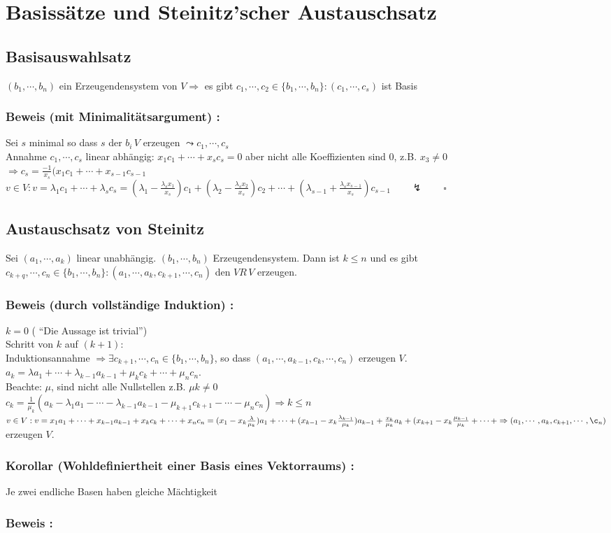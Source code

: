 \section{Basissätze und Steinitz'scher Austauschsatz}
%
%
%
\subsection{Basisauswahlsatz}
$(b_{1},\cdots, b_{n})$ ein Erzeugendensystem von $V \Rightarrow$  es gibt $c_{1},\cdots,c_{2} \in \{b_{1}, \cdots, b_{n}\}:(c_{1},\cdots,c_{s})$ ist Basis
%
\subsubsection{Beweis (mit Minimalitätsargument) :}
Sei $s$ minimal so dass $s$ der $b_{i} \, V$  erzeugen $ \leadsto c_{1},\cdots,c_{s}$\\
Annahme $c_{1},\cdots,c_{s}$ linear abhängig: $x_{1}c_{1}+\cdots+x_{s}c_{s} = 0$ aber nicht alle Koeffizienten sind $0$, z.B. $x_{3} \neq 0$\\
$\Rightarrow c_{s}=\frac{-1}{x_{s}}(x_{1}c_{1}+\cdots+x_{s-1}c_{s-1}$\\
$v\in V: v=\lambda_{1}c_{1}+\cdots+\lambda_{s}c_{s}=(\lambda_{1}-\frac{\lambda_{s}x_{1}}{x_{s}})c_{1}+(\lambda_{2}-\frac{\lambda_{s}x_{2}}{x_{s}})c_{2}+\cdots+(\lambda_{s-1}+\frac{\lambda_{s}x_{s-1}}{x_{s}})c_{s-1} \qquad \lightning \qquad \square$
%
%
%
\subsection{Austauschsatz von Steinitz}
Sei $(a_{1},\cdots,a_{k})$ linear unabhängig. $(b_{1},\cdots,b_{n})$ Erzeugendensystem. Dann ist $k\leq n$ und es gibt $c_{k+q},\cdots,c_{n} \in \{b_{1},\cdots,b_{n}\}:(a_{1},\cdots,a_{k},c_{k+1},\cdots,c_{n})$ den $VR \, V$ erzeugen.
%
\subsubsection{Beweis (durch vollständige Induktion) :}
$k=0$ ( "`Die Aussage ist trivial"')\\
Schritt von $k$ auf $(k+1)$: \\
Induktionsannahme $\Rightarrow \exists c_{k+1},\cdots,c_{n} \in \{b_{1},\cdots,b_{n}\}$, so dass $(a_{1},\cdots,a_{k-1},c_{k},\cdots,c_{n})$ erzeugen $V$. \\
$a_{k}=\lambda a_{1}+\cdots+\lambda_{k-1}a_{k-1}+\mu_{k}c_{k}+\cdots+\mu_{n}c_{n}$. \\
Beachte: $\mu$, sind nicht alle Nullstellen z.B. $\mu k \neq 0$\\
$c_{k}=\frac{1}{\mu_{k}}(a_{k}-\lambda_{1}a_{1}-\cdots-\lambda_{k-1}a_{k-1}-\mu_{k+1}c_{k+1}-\cdots-\mu_{n}c_{n}) \Rightarrow k \leq n$\\
$v\in V: v = x_{1}a_{1}+\cdots+x_{k-1}a_{k-1}+x_{k}c_{k}+\cdots+x_{n}c_{n}=(x_{1}-x_{k}\frac{\lambda}{\mu_{k}})a_{1}+\cdots+(x_{k-1}-x_{k}\frac{\lambda_{k-1}}{\mu_{k}})a_{k-1}+\frac{x_{k}}{\mu_{k}}a_{k}+(x_{k+1}-x_{k}\frac{\mu_{k-1}}{\mu_{k}}+\cdots+ \Rightarrow (a_{1},\cdots,a_{k},c_{k+1},\cdots,\c_{n})$ erzeugen $V$. 
%
\subsubsection{Korollar (Wohldefiniertheit einer Basis eines Vektorraums) :}
Je zwei endliche Basen haben gleiche Mächtigkeit
%
\subsubsection{Beweis :}
